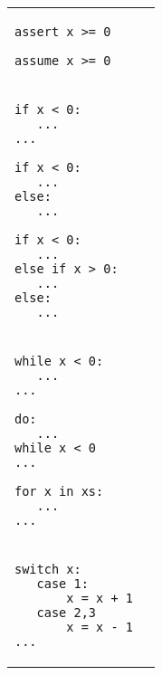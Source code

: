 \documentclass[a4paper,10pt,twcolumn]{article}
\begin{document}
\begin{tabular}{lr}
\begin{minipage}[t]{3cm}
\begin{lstlisting}
assert x >= 0
\end{lstlisting}
\end{minipage}
\hspace*{0.25cm}
\begin{minipage}[t]{3cm}
\begin{lstlisting}
assume x >= 0
\end{lstlisting}
\end{minipage}
\\
\begin{minipage}[t]{2.7cm}
\begin{lstlisting}
if x < 0:
   ...
...
\end{lstlisting}
\end{minipage} 
\hspace*{0.25cm}
\begin{minipage}[t]{2.25cm}
\begin{lstlisting}
if x < 0:
   ...
else:
   ...
\end{lstlisting}
\end{minipage}
\hspace*{0.25cm}
\begin{minipage}[t]{3cm}
\begin{lstlisting}
if x < 0:
   ...
else if x > 0:
   ...
else:
   ...
\end{lstlisting}
\end{minipage}\\
\begin{minipage}[t]{2.75cm}
\begin{lstlisting}
while x < 0:
   ...
...
\end{lstlisting}
\end{minipage}
\hspace*{0.2cm}
\begin{minipage}[t]{2.5cm}
\begin{lstlisting}
do:
   ...
while x < 0
...
\end{lstlisting}
\end{minipage}
\hspace*{0.2cm}
\begin{minipage}[t]{2.75cm}
\begin{lstlisting}
for x in xs:
   ...
...
\end{lstlisting}
\end{minipage}\\

\begin{minipage}[t]{3.75cm}
\begin{lstlisting}
switch x:
   case 1:
       x = x + 1
   case 2,3
       x = x - 1
...
\end{lstlisting}
\end{minipage}\\


\end{tabular}
\newpage
\end{document}
